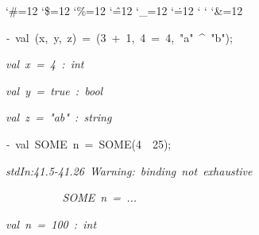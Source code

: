 \begin{list}{}
{\setlength{\leftmargin}{\leftmargini}
\setlength{\rightmargin}{0cm}
\setlength{\itemindent}{0cm}
\setlength{\listparindent}{0cm}
\setlength{\itemsep}{0cm}
\setlength{\parsep}{0cm}
\setlength{\labelsep}{0cm}
\setlength{\labelwidth}{0cm}
\catcode`\#=12
\catcode`\$=12
\catcode`\%=12
\catcode`\^=12
\catcode`\_=12
\catcode`\.=12
\catcode`
\catcode`
\catcode`\&=12
\ttfamily}
\small
\item[]\textsl{-\ }val\ (x,\ y,\ z)\ =\ (3\ +\ 1,\ 4\ =\ 4,\ "a"\ ^\ "b");
\item[]\textsl{val\ x\ =\ 4\ :\ int}
\item[]\textsl{val\ y\ =\ true\ :\ bool}
\item[]\textsl{val\ z\ =\ "ab"\ :\ string}
\item[]\textsl{-\ }val\ SOME\ n\ =\ SOME(4\ \ 25);
\item[]\textsl{stdIn:41.5-41.26\ Warning:\ binding\ not\ exhaustive}
\item[]\textsl{\ \ \ \ \ \ \ \ \ \ SOME\ n\ =\ ...}
\item[]\textsl{val\ n\ =\ 100\ :\ int}
\end{list}
